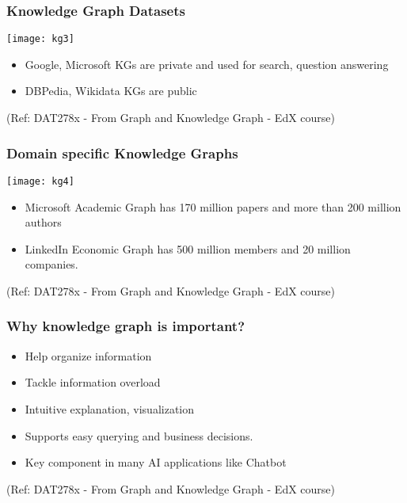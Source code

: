 \begin{frame}\frametitle{Knowledge Graph Datasets}

\begin{center}
\texttt{[image: kg3]}
\end{center}	

\begin{itemize}
\item Google, Microsoft KGs are private and used for search, question answering
\item DBPedia, Wikidata KGs are public
\end{itemize}

{\tiny (Ref: DAT278x - From Graph and Knowledge Graph - EdX course)}
\end{frame}

\begin{frame}\frametitle{Domain specific Knowledge Graphs}

\begin{center}
\texttt{[image: kg4]}
\end{center}	


\begin{itemize}
\item Microsoft Academic Graph has 170 million papers and more than 200 million authors
\item LinkedIn Economic Graph has 500 million members and 20 million companies.
\end{itemize}

{\tiny (Ref: DAT278x - From Graph and Knowledge Graph - EdX course)}
\end{frame}


\begin{frame}\frametitle{Why knowledge graph is important?}

\begin{itemize}
\item Help organize information
\item Tackle information overload
\item Intuitive explanation, visualization
\item Supports easy querying and business decisions.
\item Key component in many AI applications like Chatbot
\end{itemize}

{\tiny (Ref: DAT278x - From Graph and Knowledge Graph - EdX course)}
\end{frame}

